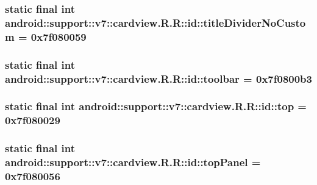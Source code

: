 \hypertarget{classandroid_1_1support_1_1v7_1_1cardview_1_1_r_1_1id_dca895c9529bffa40411a9ec7b0e6db0}{
\subsubsection[{titleDividerNoCustom}]{\setlength{\rightskip}{0pt plus 5cm}static final int android::support::v7::cardview.R.R::id::titleDividerNoCustom = 0x7f080059}}
\label{classandroid_1_1support_1_1v7_1_1cardview_1_1_r_1_1id_dca895c9529bffa40411a9ec7b0e6db0}


\hypertarget{classandroid_1_1support_1_1v7_1_1cardview_1_1_r_1_1id_0af1df872d043bb0fea6440a75f2bb14}{
\subsubsection[{toolbar}]{\setlength{\rightskip}{0pt plus 5cm}static final int android::support::v7::cardview.R.R::id::toolbar = 0x7f0800b3}}
\label{classandroid_1_1support_1_1v7_1_1cardview_1_1_r_1_1id_0af1df872d043bb0fea6440a75f2bb14}


\hypertarget{classandroid_1_1support_1_1v7_1_1cardview_1_1_r_1_1id_82eac350d37ba40f066bca4ac995c64e}{
\subsubsection[{top}]{\setlength{\rightskip}{0pt plus 5cm}static final int android::support::v7::cardview.R.R::id::top = 0x7f080029}}
\label{classandroid_1_1support_1_1v7_1_1cardview_1_1_r_1_1id_82eac350d37ba40f066bca4ac995c64e}


\hypertarget{classandroid_1_1support_1_1v7_1_1cardview_1_1_r_1_1id_68f3d5ffc90e48245981104c01ffadd7}{
\subsubsection[{topPanel}]{\setlength{\rightskip}{0pt plus 5cm}static final int android::support::v7::cardview.R.R::id::topPanel = 0x7f080056}}
\label{classandroid_1_1support_1_1v7_1_1cardview_1_1_r_1_1id_68f3d5ffc90e48245981104c01ffadd7}


